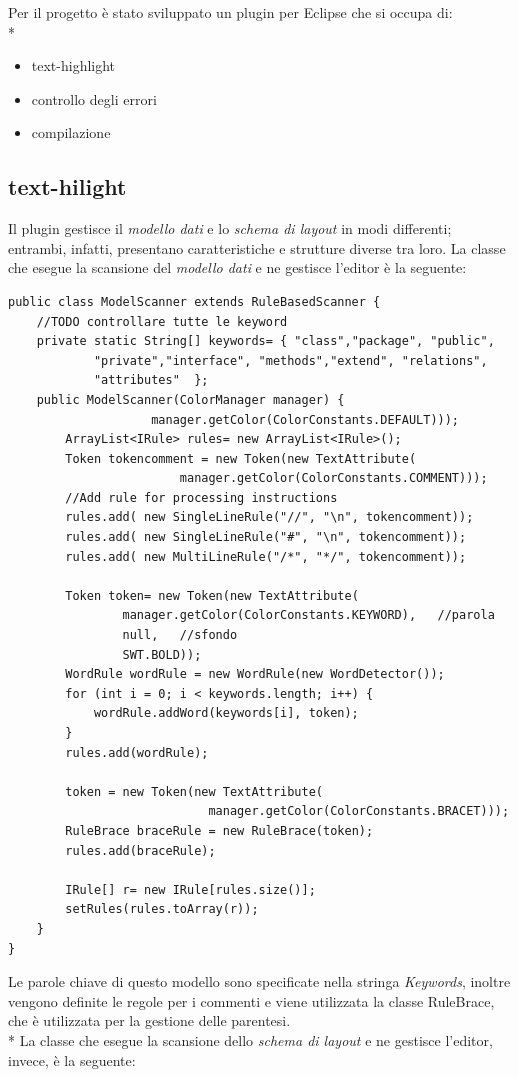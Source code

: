 Per il progetto è stato sviluppato un plugin per Eclipse che si occupa di: \\*
\begin{itemize}
  \item text-highlight
  \item controllo degli errori
  \item compilazione
\end{itemize} 


\subsection{text-hilight}
Il plugin gestisce il \emph{modello dati} e lo \emph{schema di layout} in modi differenti; 
entrambi, infatti, presentano caratteristiche e strutture diverse tra loro.
La classe che esegue la scansione del \emph{modello dati} e ne gestisce l'editor
è la seguente:

\begin{lstlisting}[caption={ModelScanner}, style={java}]
public class ModelScanner extends RuleBasedScanner {
	//TODO controllare tutte le keyword
	private static String[] keywords= { "class","package", "public",
			"private","interface", "methods","extend", "relations", 
			"attributes"  };
	public ModelScanner(ColorManager manager) {
					manager.getColor(ColorConstants.DEFAULT)));
		ArrayList<IRule> rules= new ArrayList<IRule>();	
		Token tokencomment = new Token(new TextAttribute(
						manager.getColor(ColorConstants.COMMENT)));
		//Add rule for processing instructions
		rules.add( new SingleLineRule("//", "\n", tokencomment));
		rules.add( new SingleLineRule("#", "\n", tokencomment));
		rules.add( new MultiLineRule("/*", "*/", tokencomment));
		
		Token token= new Token(new TextAttribute(
				manager.getColor(ColorConstants.KEYWORD), 	//parola
				null, 	//sfondo
				SWT.BOLD));
		WordRule wordRule = new WordRule(new WordDetector());
		for (int i = 0; i < keywords.length; i++) {
			wordRule.addWord(keywords[i], token);
		}		
		rules.add(wordRule);
		
		token = new Token(new TextAttribute(
							manager.getColor(ColorConstants.BRACET)));
		RuleBrace braceRule = new RuleBrace(token);
		rules.add(braceRule);
		
		IRule[] r= new IRule[rules.size()];
		setRules(rules.toArray(r));
	}
}
\end{lstlisting}


Le parole chiave di questo modello sono specificate nella stringa
\emph{Keywords}, inoltre vengono definite le regole per i commenti e viene
utilizzata la classe RuleBrace, che è utilizzata per la gestione delle
parentesi.\\* 
La classe che esegue la scansione dello  \emph{schema di layout} e ne gestisce
l'editor, invece, è la seguente:

